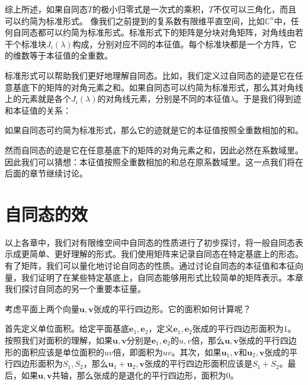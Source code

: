 \documentclass[12pt,UTF8]{ctexbook}
\begin{document}
综上所述，如果自同态$T$的极小归零式是一次式的乘积，$T$不仅可以三角化，而且可以约简为标准形式。
像我们之前提到的复系数有限维平直空间，比如$\mathbb{C}^n$中，任何自同态都可以约简为标准形式。标准形式下的矩阵是分块对角矩阵，对角线由若干个标准块$J_i(\lambda)$构成，分别对应不同的本征值。每个标准块都是一个方阵，它的维数等于本征值的全重数。

标准形式可以帮助我们更好地理解自同态。比如，我们定义过自同态的迹是它在任意基底下的矩阵的对角元素之和。如果自同态可以约简为标准形式，那么其对角线上的元素就是各个$J_i(\lambda)$的对角线元素，分别是不同的本征值$\lambda$。于是我们得到迹和本征值的关系：
\begin{tm}
    如果自同态可约简为标准形式，那么它的迹就是它的本征值按照全重数相加的和。
\end{tm}
然而自同态的迹是它在任意基底下的矩阵的对角元素之和，因此必然在系数域里。因此我们可以猜想：本征值按照全重数相加的和总在原系数域里。这一点我们将在后面的章节继续讨论。

\chapter{自同态的效}
以上各章中，我们对有限维空间中自同态的性质进行了初步探讨，将一般自同态表示成更简单、更好理解的形式。我们使用矩阵来记录自同态在特定基底上的形态。有了矩阵，我们可以量化地讨论自同态的性质。通过讨论自同态的本征值和本征向量，我们证明了在某些特定基底上，自同态能够用形式比较简单的矩阵表示。本章我们探讨自同态的另一个重要本征量。

考虑平面上两个向量$\mathbf{u}, \mathbf{v}$张成的平行四边形。它的面积如何计算呢？

首先定义单位面积。给定平面基底$\mathbf{e}_1, \mathbf{e}_2$，定义$\mathbf{e}_1, \mathbf{e}_2$张成的平行四边形面积为$1$。按照我们对面积的理解，如果$\mathbf{u}, \mathbf{v}$分别是$\mathbf{e}_1, \mathbf{e}_2$的$u,v$倍，那么$\mathbf{u}, \mathbf{v}$张成的平行四边形的面积应该是单位面积的$uv$倍，即面积为$uv$。其次，如果$\mathbf{u}_1, \mathbf{v}$和$\mathbf{u}_2, \mathbf{v}$张成的平行四边形面积为$S_1, S_2$，那么$\mathbf{u}_1+\mathbf{u}_2, \mathbf{v}$张成的平行四边形面积应该是$S_1+S_2$。最后，如果$\mathbf{u}, \mathbf{v}$共轴，那么张成的是退化的平行四边形，面积为$0$。
\end{document}
